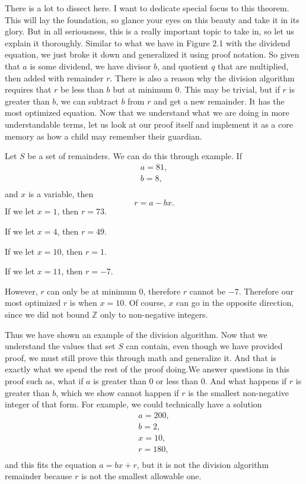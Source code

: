 There is a lot to dissect here.
I want to dedicate special focus to this theorem.
This will lay the foundation, so glance your eyes on this beauty and take it in its glory.
But in all seriousness, this is a really important topic to take in, so let us explain it thoroughly.
Similar to what we have in Figure 2.1 with the dividend equation, we just broke it down and generalized it using proof notation.
So given that $a$ is some dividend, we have divisor $b$, and quotient $q$ that are multiplied, then added with remainder $r$.
There is also a reason why the division algorithm requires that $r$ be less than $b$ but at minimum $0$.
This may be trivial, but if $r$ is greater than $b$, we can subtract $b$ from $r$ and get a new remainder.
It has the most optimized equation.
Now that we understand what we are doing in more understandable terms, let us look at our proof itself and implement it as a core memory as how a child may remember their guardian.

\begin{example}
    Let $S$ be a set of remainders.
    We can do this through example.
    If
    \begin{gather*}
        a = 81,\\
        b = 8,\\
    \end{gather*}
    and $x$ is a variable, then
    \[
        r = a-bx.
    \]
    If we let $x = 1$, then $r = 73$.

    If we let $x = 4$, then $r = 49$.

    If we let $x = 10$, then $r = 1$.

    If we let $x = 11$, then $r = -7$.

    However, $r$ can only be at minimum $0$, therefore $r$ cannot be $-7$.
    Therefore our most optimized $r$ is when $x = 10$.
    Of course, $x$ can go in the opposite direction, since we did not bound $\mathbb{Z}$ only to non-negative integers.
\end{example}

Thus we have shown an example of the division algorithm.
Now that we understand the values that set $S$ can contain, even though we have provided proof, we must still prove this through math and generalize it.
And that is exactly what we spend the rest of the proof doing.We answer questions in this proof such as, what if $a$ is greater than $0$ or less than $0$.
And what happens if $r$ is greater than $b$, which we show cannot happen if $r$ is the smallest non-negative integer of that form.
For example, we could technically have a solution
\begin{gather*}
    a = 200,\\
    b = 2,\\
    x = 10,\\
    r = 180,\\
\end{gather*}
and this fits the equation $a = bx + r$, but it is not the division algorithm remainder because $r$ is not the smallest allowable one.

